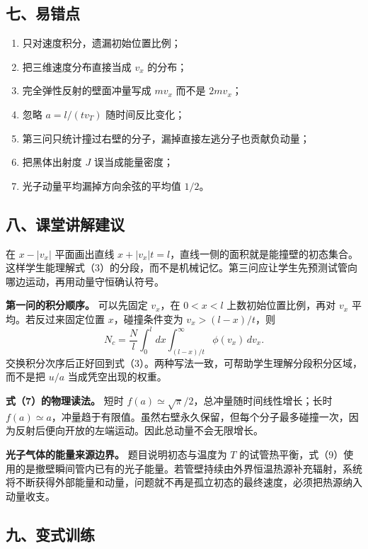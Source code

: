 \documentclass[12pt,a4paper,UTF8]{ctexart}
\newcommand{\tightlist}{\setlength{\itemsep}{0pt}\setlength{\parskip}{0pt}}
\begin{document}
\subsection{七、易错点}\label{ux4e03ux6613ux9519ux70b9-5}

\begin{enumerate}
\def\labelenumi{\arabic{enumi}.}
\tightlist
\item
  只对速度积分，遗漏初始位置比例；
\item
  把三维速度分布直接当成 \(v_x\) 的分布；
\item
  完全弹性反射的壁面冲量写成 \(mv_x\) 而不是 \(2mv_x\)；
\item
  忽略 \(a=l/(tv_T)\) 随时间反比变化；
\item
  第三问只统计撞过右壁的分子，漏掉直接左逃分子也贡献负动量；
\item
  把黑体出射度 \(J\) 误当成能量密度；
\item
  光子动量平均漏掉方向余弦的平均值 \(1/2\)。
\end{enumerate}

\subsection{八、课堂讲解建议}\label{ux516bux8bfeux5802ux8bb2ux89e3ux5efaux8bae-5}

在 \(x-|v_x|\) 平面画出直线
\(x+|v_x|t=l\)，直线一侧的面积就是能撞壁的初态集合。这样学生能理解式（3）的分段，而不是机械记忆。第三问应让学生先预测试管向哪边运动，再用动量守恒确认符号。

\textbf{第一问的积分顺序。} 可以先固定 \(v_x\)，在 \(0<x<l\)
上数初始位置比例，再对 \(v_x\) 平均。若反过来固定位置
\(x\)，碰撞条件变为 \(v_x>(l-x)/t\)，则 \[
N_c=\frac Nl\int_0^l dx
\int_{(l-x)/t}^{\infty}\phi(v_x)\,dv_x.
\]
交换积分次序后正好回到式（3）。两种写法一致，可帮助学生理解分段积分区域，而不是把
\(u/a\) 当成凭空出现的权重。

\textbf{式（7）的物理读法。} 短时
\(f(a)\simeq\sqrt\pi/2\)，总冲量随时间线性增长；长时
\(f(a)\simeq a\)，冲量趋于有限值。虽然右壁永久保留，但每个分子最多碰撞一次，因为反射后便向开放的左端运动。因此总动量不会无限增长。

\textbf{光子气体的能量来源边界。} 题目说明初态与温度为 \(T\)
的试管热平衡，式（9）使用的是撤壁瞬间管内已有的光子能量。若管壁持续由外界恒温热源补充辐射，系统将不断获得外部能量和动量，问题就不再是孤立初态的最终速度，必须把热源纳入动量收支。

\subsection{九、变式训练}\label{ux4e5dux53d8ux5f0fux8badux7ec3-5}
\end{document}
